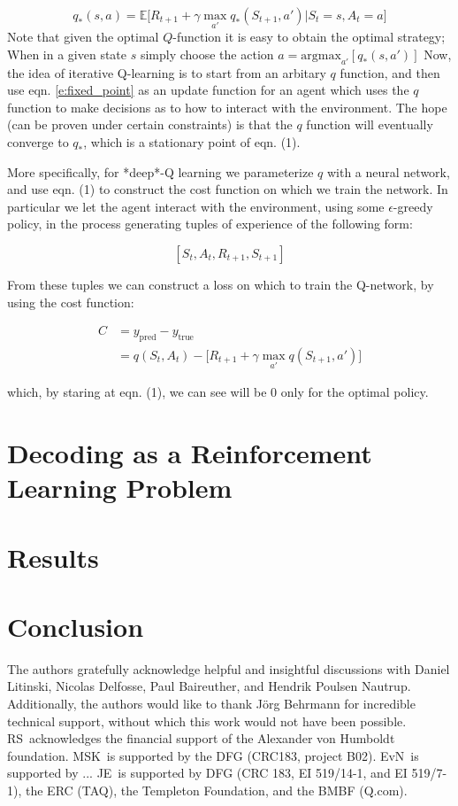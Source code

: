 \documentclass[twocolumn,preprintnumbers,amsmath,amssymb,notitlepage,nofootinbib,longbibliography,superscriptaddress,aps,pra,10pt]{revtex4-1}
\begin{document}
    \begin{equation}\label{e:fixed_point}
        q_*(s,a) = \mathbb{E}\big[R_{t+1} + \gamma\max_{a'}q_{*}(S_{t+1},a')\big|S_t = s, A_t = a \big]
    \end{equation}
    Note that given the optimal $Q$-function it is easy to obtain the optimal strategy; When in a given state $s$ simply choose the action $a = \mathrm{argmax}_{a'}[q_*(s,a')]$ Now, the idea of iterative Q-learning is to start from an arbitary $q$ function, and then use eqn. \eqref{e:fixed_point} as an update function for an agent which uses the $q$ function to make decisions as to how to interact with the environment. The hope (can be proven under certain constraints) is that the $q$ function will eventually converge to $q_*$, which is a stationary point of eqn. (1).

    More specifically, for *deep*-Q learning we parameterize $q$ with a neural network, and use eqn. (1) to construct the cost function on which we train the network. In particular we let the agent interact with the environment, using some $\epsilon$-greedy policy, in the process generating tuples of experience of the following form:

    $$[S_t,A_t,R_{t+1},S_{t+1}]$$

    From these tuples we can construct a loss on which to train the Q-network, by using the cost function:

    \begin{align} 
    C &= y_{\mathrm{pred}} - y_{\mathrm{true}}\\
    &= q(S_t,A_t) - \big[R_{t+1} + \gamma\max_{a'}q(S_{t+1},a') \big]
    \end{align}

    which, by staring at eqn. (1), we can see will be 0 only for the optimal policy.

\section{Decoding as a Reinforcement Learning Problem}\label{s:decoding_as_rl}
\section{Results}\label{s:results}
\section{Conclusion}\label{s:conclusions}


\begin{acknowledgments}
	The authors gratefully acknowledge helpful and insightful discussions with Daniel Litinski, Nicolas Delfosse, Paul Baireuther, and Hendrik Poulsen Nautrup.
	Additionally, the authors would like to thank J\"{o}rg Behrmann for incredible technical support, without which this work would not have been possible.
	RS\ acknowledges the financial support of the Alexander von Humboldt foundation.
	MSK\ is supported by the DFG (CRC183, project B02).
	EvN\ is supported by ...
	JE\ is supported by DFG (CRC 183, EI 519/14-1, and EI 519/7-1), the ERC (TAQ), the Templeton Foundation, and the BMBF (Q.com).
\end{acknowledgments}


\end{document}
